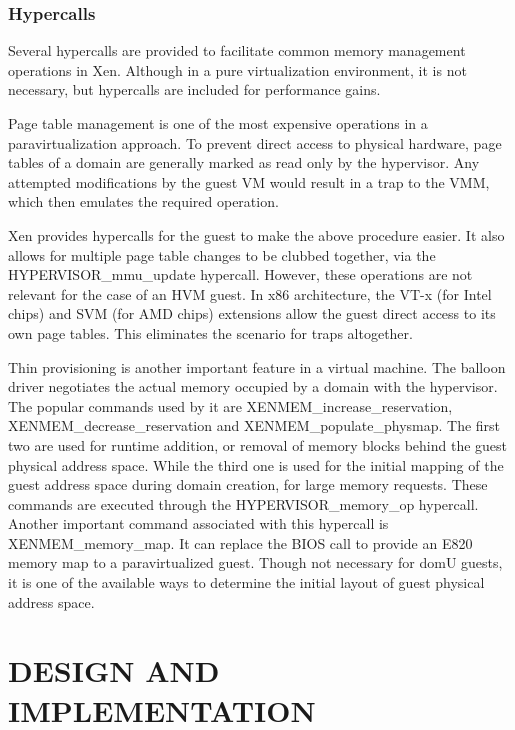 \subsection{Hypercalls}
Several hypercalls are provided to facilitate common memory management operations in Xen. Although in a pure virtualization environment, it is not necessary, but hypercalls are included for performance gains.  

 

Page table management is one of the most expensive operations in a paravirtualization approach. To prevent direct access to physical hardware, page tables of a domain are generally marked as read only by the hypervisor. Any attempted modifications by the guest VM would result in a trap to the VMM, which then emulates the required operation. 


Xen provides hypercalls for the guest to make the above procedure easier. It also allows for multiple page table changes to be clubbed together, via the HYPERVISOR\_mmu\_update hypercall. However, these operations are not relevant for the case of an HVM guest. In x86 architecture, the VT-x (for Intel chips) and SVM (for AMD chips) extensions allow the guest direct access to its own page tables. This eliminates the scenario for traps altogether.  

 

Thin provisioning is another important feature in a virtual machine. The balloon driver negotiates the actual memory occupied by a domain with the hypervisor. The popular commands used by it are XENMEM\_increase\_reservation, XENMEM\_decrease\_reservation and XENMEM\_populate\_physmap. The first two are used for runtime addition, or removal of memory blocks behind the guest physical address space. While the third one is used for the initial mapping of the guest address space during domain creation, for large memory requests. These commands are executed through the HYPERVISOR\_memory\_op hypercall. Another important command associated with this hypercall is XENMEM\_memory\_map. It can replace the BIOS call to provide an E820 memory map to a paravirtualized guest. Though not necessary for domU guests, it is one of the available ways to determine the initial layout of guest physical address space. 




\chapter{\uppercase{Design and Implementation}}

